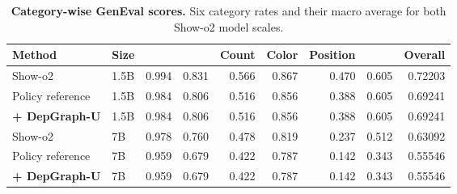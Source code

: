 \begin{table}[!htb]
\centering
\caption{\textbf{Category-wise GenEval scores.} Six category rates and their macro average for both Show-o2 model scales.}
\label{tab:genevalcats}
\begingroup\tableformat

\begin{tabularx}{\linewidth}{L{82pt}C{26pt}|*{6}{R}|R}
\toprule
\textbf{Method} & \textbf{Size} & \textbf{} & \textbf{} & \textbf{Count} & \textbf{Color} & \textbf{Position} & \textbf{} & \textbf{Overall} \\
\midrule
{}
Show-o2 & 1.5B & 0.994 & 0.831 & 0.566 & 0.867 & 0.470 & 0.605 & 0.72203 \\
Policy reference & 1.5B & 0.984 & 0.806 & 0.516 & 0.856 & 0.388 & 0.605 & 0.69241 \\
\textbf{+ DepGraph-U} & 1.5B & 0.984 & 0.806 & 0.516 & 0.856 & 0.388 & 0.605 & 0.69241 \\
\midrule
{}
Show-o2 & 7B & 0.978 & 0.760 & 0.478 & 0.819 & 0.237 & 0.512 & 0.63092 \\
Policy reference & 7B & 0.959 & 0.679 & 0.422 & 0.787 & 0.142 & 0.343 & 0.55546 \\
\textbf{+ DepGraph-U} & 7B & 0.959 & 0.679 & 0.422 & 0.787 & 0.142 & 0.343 & 0.55546 \\
\bottomrule
\end{tabularx}
\endgroup
\end{table}
